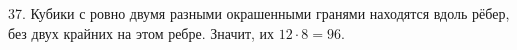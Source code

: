 37. Кубики с ровно двумя разными окрашенными гранями находятся вдоль рёбер, без двух крайних на этом ребре. Значит, их $12\cdot8=96.$\\
